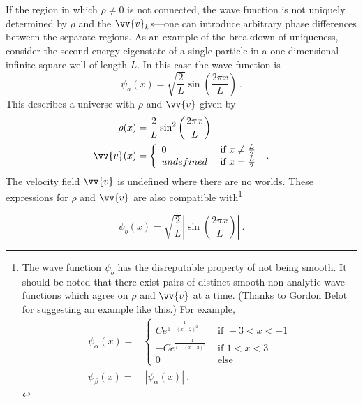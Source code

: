 \documentclass[12pt,secnumarabic,balancelastpage,amsmath,amssymb,nofootinbib]{article}
\begin{document}
If the region in which $\rho\neq0$ is not connected, the wave function is not uniquely determined by $\rho$ and the $\vv{v}_k$s---one can introduce arbitrary phase differences between the separate regions.  As an example of the breakdown of uniqueness, consider the second energy eigenstate of a single particle in a one-dimensional infinite square well of length $L$.  In this case the wave function is
\begin{equation}
\psi_a(x)=\sqrt{\frac{2}{L}}\sin\left(\frac{2\pi x}{L}\right)\ .
\label{trouble}
\end{equation}
This describes a universe with $\rho$ and $\vv{v}$ given by
\begin{align}
\rho(x)&=\frac{2}{L}\sin^2\left(\frac{2\pi x}{L}\right)
\nonumber
\\
\vv{v}(x)&=\left\{\begin{array}{ll} 0 & \mbox{   if }x\neq \frac{L}{2} \\ undefined & \mbox{   if }x= \frac{L}{2} \end{array}\right.\ .
\label{dwbwoe}
\end{align}
The velocity field $\vv{v}$ is undefined where there are no worlds.  These expressions for $\rho$ and $\vv{v}$ are also compatible with\footnote{The wave function $\psi_b$ has the disreputable property of not being smooth.  It should be noted that there exist pairs of distinct smooth non-analytic wave functions which agree on $\rho$ and $\vv{v}$ at a time. (Thanks to Gordon Belot for suggesting an example like this.)  For example, %
\begin{align}
\psi_{\alpha}(x)=&\left\{\begin{array}{ll}
C e^{\frac{-1}{1-(x+2)^2}} & \mbox{       if }-3<x<-1 \\ -C e^{\frac{-1}{1-(x-2)^2}} & \mbox{       if }1<x<3 \\ 0 & \mbox{       else}\end{array}\right.
\nonumber
\\
\psi_{\beta}(x)=& \  |\psi_{\alpha}(x)| \ .
\nonumber
\end{align}}

\begin{equation}
\psi_b(x)=\sqrt{\frac{2}{L}}\left|\sin\left(\frac{2\pi x}{L}\right)\right| \ .
\label{evil}
\end{equation}
\end{document}
